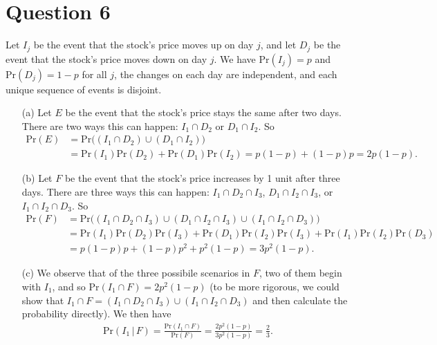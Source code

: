 \documentclass[10pt]{article}
\begin{document}
\section{Question 6} \noindent
Let \(I_j\) be the event that the stock's price moves up on day \(j\), and let \(D_j\) be the event that the stock's price moves down on day \(j\). 
We have \(\mathrm{Pr}(I_j) = p\) and \(\mathrm{Pr}(D_j) = 1 - p\) for all \(j\), the changes on each day are independent, and each unique sequence of 
events is disjoint. 
\begin{itemize}
    \item[(a)] Let \(E\) be the event that the stock's price stays the same after two days. There are two ways this can happen: \(I_1 \cap D_2\) or 
    \(D_1 \cap I_2\). So 
    \begin{align*}
        \mathrm{Pr}(E) &= \mathrm{Pr} \Big( (I_1 \cap D_2) \cup (D_1 \cap I_2) \Big) \\
        &= \mathrm{Pr}(I_1)\mathrm{Pr}(D_2) + \mathrm{Pr}(D_1) \mathrm{Pr}(I_2) 
        = p(1-p) + (1-p)p = 2p(1-p).
    \end{align*}
    \item[(b)] Let \(F\) be the event that the stock's price increases by 1 unit after three days. There are three ways this can happen: \(I_1 \cap D_2 \cap I_3\), 
    \(D_1 \cap I_2 \cap I_3\), or \(I_1 \cap I_2 \cap D_3\). So 
    \begin{align*}
        \mathrm{Pr}(F) &= \mathrm{Pr} \Big( (I_1 \cap D_2 \cap I_3) \cup (D_1 \cap I_2 \cap I_3) \cup (I_1 \cap I_2 \cap D_3) \Big) \\
        &= \mathrm{Pr}(I_1)\mathrm{Pr}(D_2)\mathrm{Pr}(I_3) + \mathrm{Pr}(D_1)\mathrm{Pr}(I_2)\mathrm{Pr}(I_3) + \mathrm{Pr}(I_1)\mathrm{Pr}(I_2)\mathrm{Pr}(D_3) \\
        &= p(1-p)p + (1-p)p^2 + p^2 (1-p) = 3p^2(1-p).
    \end{align*}
    \item[(c)] %
    We observe that of the three possibile scenarios in \(F\), two of them begin with \(I_1\), and so \(\mathrm{Pr}(I_1 \cap F) = 2 p^2 (1-p)\) (to be
    more rigorous, we could show that \(I_1 \cap F = 
    (I_1 \cap D_2 \cap I_3) \cup (I_1 \cap I_2 \cap D_3)\) and then calculate the probability directly). We then have 
    \begin{align*}
        \mathrm{Pr}(I_1 \,|\, F) = \frac{\mathrm{Pr}(I_1 \cap F)}{\mathrm{Pr}(F)} = \frac{2 p^2 (1-p)}{3 p^2 (1-p)} = \frac{2}{3}.
    \end{align*}
\end{itemize}
\end{document}
